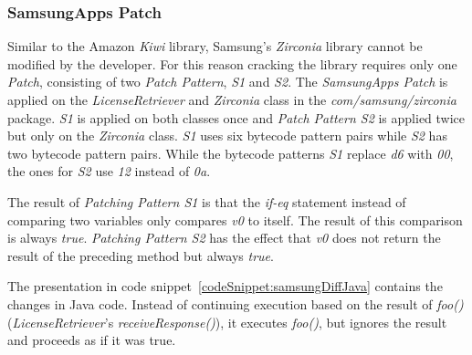 \subsubsection{SamsungApps Patch}
Similar to the Amazon \textit{Kiwi} library, Samsung's \textit{Zirconia} library cannot be modified by the developer.
For this reason cracking the library requires only one \textit{Patch}, consisting of two \textit{Patch Pattern}, \textit{S1} and \textit{S2}.
The \textit{SamsungApps Patch} is applied on the \textit{LicenseRetriever} and \textit{Zirconia} class in the \textit{com/samsung/zirconia} package.
\textit{S1} is applied on both classes once and \textit{Patch Pattern S2} is applied twice but only on the \textit{Zirconia} class.
\newline
\textit{S1} uses six bytecode pattern pairs while \textit{S2} has two bytecode pattern pairs.
While the bytecode patterns \textit{S1} replace \textit{d6} with \textit{00}, the ones for \textit{S2} use \textit{12} instead of \textit{0a}.
\newline


The result of \textit{Patching Pattern S1} is that the \textit{if-eq} statement instead of comparing two variables only compares \textit{v0} to itself.
The result of this comparison is always \textit{true}.
\newline
\textit{Patching Pattern S2} has the effect that \textit{v0} does not return the result of the preceding method but always \textit{true}.
\newline

The presentation in code snippet~\ref{codeSnippet:samsungDiffJava} contains the changes in Java code.
Instead of continuing execution based on the result of \textit{foo()} (\textit{LicenseRetriever}'s \textit{receiveResponse()}), it executes \textit{foo()}, but ignores the result and proceeds as if it was true.
